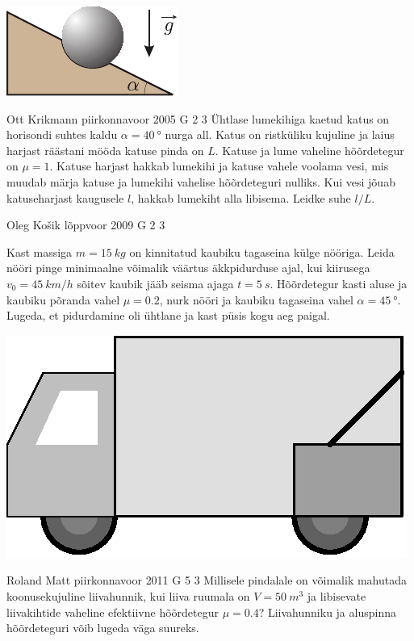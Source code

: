 \documentclass[11pt]{article}
\begin{document}
{{\begin{center}
	\includegraphics[width=0.4\linewidth]{2005-lahg-03-yl}
\end{center}
\fi
}

{Ott Krikmann} %
{piirkonnavoor} %
{2005} %
{G 2} %
{3} %
{
\ifStatement
Ühtlase lumekihiga kaetud katus on horisondi suhtes kaldu $\alpha = \SI{40}{\degree}$ nurga all. Katus on ristküliku kujuline ja laius harjast räästani mööda katuse pinda on $L$. Katuse ja lume vaheline hõõrdetegur on $\mu = \num{1}$. Katuse harjast hakkab lumekihi ja katuse vahele voolama vesi, mis muudab märja katuse ja lumekihi vahelise hõõrdeteguri nulliks. Kui vesi jõuab katuseharjast kaugusele $l$, hakkab lumekiht alla libisema. Leidke suhe $l/L$.
\fi
}

{Oleg Košik} %
{lõppvoor} %
{2009} %
{G 2} %
{3} %
{
\ifStatement
Kast massiga $m=\SI{15}{kg}$ on kinnitatud kaubiku tagaseina külge nööriga. Leida nööri pinge minimaalne võimalik väärtus äkkpidurduse ajal, kui kiirusega $v_0=\SI{45}{km/h}$ sõitev kaubik jääb seisma ajaga $t=\SI{5}{s}$. Hõõrdetegur kasti aluse ja kaubiku põranda vahel $\mu=\num{0,2}$, nurk nööri ja kaubiku tagaseina vahel $\alpha=\SI{45}{\degree}$. Lugeda, et pidurdamine oli ühtlane ja kast püsis kogu aeg paigal.
\begin{center}
	\includegraphics[width=0.5\linewidth]{2009-v3g-02-G_kast_kaubikus.eps}
\end{center}
\fi
}

{Roland Matt} %
{piirkonnavoor} %
{2011} %
{G 5} %
{3} %
{
\ifStatement
Millisele pindalale on võimalik mahutada koonusekujuline liivahunnik, kui liiva ruumala on $V=\SI{50}{m^{3}}$ ja libisevate liivakihtide vaheline efektiivne hõõrdetegur $\mu=\num{0.4}$? Liivahunniku ja aluspinna hõõrdeteguri võib lugeda väga suureks.
\fi
}

}
\end{document}
